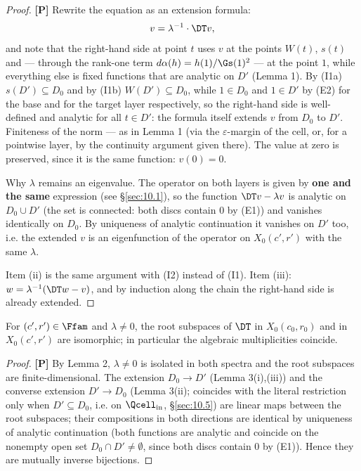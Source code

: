 \begin{proof}
\textbf{[P]} Rewrite the equation as an extension formula:
\[
v = \lambda^{-1} \cdot \DT v ,
\]
and note that the right-hand side at point $t$ uses $v$ at the points
$W(t)$, $s(t)$ and --- through the rank-one term $d\alpha(h) = h(1)/\Gs(1)^2$ --- at the
point $1$, while everything else is fixed functions that are analytic
on $D'$ (Lemma 1). By (I1a) $s(D') \subseteq D_0$ and by (I1b) $W(D') \subseteq D_0$, while
$1 \in D_0$ and $1 \in D'$ by (E2) for the base and for the target layer respectively, so the
right-hand side is well-defined and analytic for all $t \in D'$: the formula
itself extends $v$ from $D_0$ to $D'$. Finiteness of the norm --- as in Lemma 1
(via the $\varepsilon$-margin of the cell, or, for a pointwise layer, by the
continuity argument given there). The value at zero is preserved, since it is
the same function: $v(0) = 0$.

Why $\lambda$ remains an eigenvalue. The operator on both layers is given by \textbf{one
and the same} expression (see \S\ref{sec:10.1}), so the function $\DT v - \lambda v$ is analytic
on $D_0 \cup D'$ (the set is connected: both discs contain $0$ by (E1)) and
vanishes identically on $D_0$. By uniqueness of analytic continuation it
vanishes on $D'$ too, i.e. the extended $v$ is an eigenfunction of the operator
on $X_0(c',r')$ with the same $\lambda$.

Item (ii) is the same argument with (I2) instead of (I1). Item (iii):
$w = \lambda^{-1}(\DT w - v)$, and by induction along the chain the right-hand side is
already extended. \qedhere
\end{proof}

\begin{lemmafour}
For $(c',r') \in \Ffam$
and $\lambda \ne 0$, the root subspaces of $\DT$ in $X_0(c_0,r_0)$ and in $X_0(c',r')$
are isomorphic; in particular the algebraic multiplicities coincide.
\end{lemmafour}

\begin{proof}
\textbf{[P]} By Lemma 2, $\lambda \ne 0$ is isolated in both spectra and the root
subspaces are finite-dimensional. The extension $D_0\to D'$ (Lemma 3(i),(iii)) and
the converse extension $D'\to D_0$ (Lemma 3(ii); coincides with the literal
restriction only when $D'\subseteq D_0$, i.e. on $\Qcell_{\mathrm{in}}$, \S\ref{sec:10.5}) are linear maps between
the root subspaces; their
compositions in both directions are identical by uniqueness of analytic
continuation (both functions are analytic and coincide on the nonempty open
set $D_0 \cap D' \ne \emptyset$, since both discs contain $0$ by (E1)). Hence they are
mutually inverse bijections. \qedhere
\end{proof}

